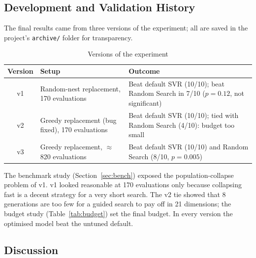 \documentclass[12pt,a4paper]{article}
\numberwithin{equation}{section}
\numberwithin{table}{section}
\numberwithin{figure}{section}
\begin{document}
\subsection{Development and Validation History}
The final results came from three versions of the experiment; all are saved in the project's \texttt{archive/} folder for transparency.
\begin{table}[H]
\centering
\caption{Versions of the experiment}
\label{tab:history}
\small
\renewcommand{\arraystretch}{1.15}
\begin{tabularx}{\textwidth}{@{}c>{\raggedright}X>{\raggedright\arraybackslash}X@{}}
\toprule
\textbf{Version} & \textbf{Setup} & \textbf{Outcome} \\ \midrule
v1 & Random-nest replacement, 170 evaluations & Beat default SVR (10/10); beat Random Search in 7/10 ($p = 0.12$, not significant) \\
v2 & Greedy replacement (bug fixed), 170 evaluations & Beat default SVR (10/10); tied with Random Search (4/10): budget too small \\
v3 & Greedy replacement, $\approx$820 evaluations & Beat default SVR (10/10) and Random Search (8/10, $p = 0.005$) \\ \bottomrule
\end{tabularx}
\end{table}
The benchmark study (Section~\ref{sec:bench}) exposed the population-collapse problem of v1. v1 looked reasonable at 170 evaluations only because collapsing fast is a decent strategy for a very short search. The v2 tie showed that 8 generations are too few for a guided search to pay off in 21 dimensions; the budget study (Table~\ref{tab:budget}) set the final budget. In every version the optimised model beat the untuned default.

\subsection{Discussion}
\end{document}
